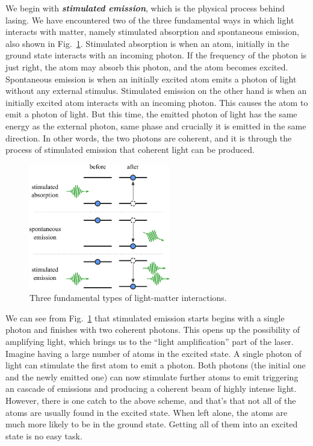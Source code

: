 We begin with \textit{\textbf{stimulated emission}}, which is the physical process behind lasing.
We have encountered two of the three fundamental ways in which light interacts with matter, namely stimulated absorption and spontaneous emission, also shown in Fig.~\ref{fig:5-3_light_matter_interaction}.
Stimulated absorption is when an atom, initially in the ground state interacts with an incoming photon. If the frequency of the photon is just right, the atom may absorb this photon, and the atom becomes excited.
Spontaneous emission is when an initially excited atom emits a photon of light without any external stimulus.
Stimulated emission on the other hand is when an initially excited atom interacts with an incoming photon.
This causes the atom to emit a photon of light.
But this time, the emitted photon of light has the same energy as the external photon, same phase and crucially it is emitted in the same direction.
In other words, the two photons are coherent, and it is through the process of stimulated emission that coherent light can be produced.

\begin{figure}[t]
    \centering
    \includegraphics[width=0.55\textwidth]{lesson5/5-3_three_interactions.pdf}
    \caption[Light-matter interactions]{Three fundamental types of light-matter interactions.}
    \label{fig:5-3_light_matter_interaction}
\end{figure}

We can see from Fig.~\ref{fig:5-3_light_matter_interaction} that stimulated emission starts begins with a single photon and finishes with two coherent photons.
This opens up the possibility of amplifying light, which brings us to the ``light amplification'' part of the laser.
Imagine having a large number of atoms in the excited state.
A single photon of light can stimulate the first atom to emit a photon.
Both photons (the initial one and the newly emitted one) can now stimulate further atoms to emit triggering an cascade of emissions and producing a coherent beam of highly intense light. 
However, there is one catch to the above scheme, and that's that not all of the atoms are usually found in the excited state.
When left alone, the atoms are much more likely to be in the ground state.
Getting all of them into an excited state is no easy task.



